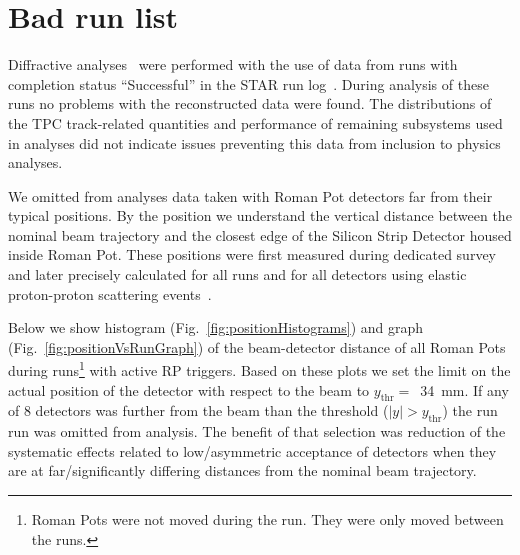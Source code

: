

\chapter{Bad run list}\label{chap:badRunList}

Diffractive analyses~\cite{AnalysisNoteRafal,AnalysisNoteLukasz} were performed with the use of data from runs with completion status ``Successful'' in the STAR run log~\cite{RunLog}. During analysis of these runs no problems with the reconstructed data were found. The distributions of the TPC track-related quantities and performance of remaining subsystems used in analyses did not indicate issues preventing this data from inclusion to physics analyses.

We omitted from analyses data taken with Roman Pot detectors far from their typical positions. By the position we understand the vertical distance between the nominal beam trajectory and the closest edge of the Silicon Strip Detector housed inside Roman Pot. These positions were first measured during dedicated survey~\cite{surveyNote} and later precisely calculated for all runs and for all detectors using elastic proton-proton scattering events~\cite{alignmentPresentation,alignmentDirectory}.%

Below we show histogram (Fig.~\ref{fig:positionHistograms}) and graph (Fig.~\ref{fig:positionVsRunGraph}) of the beam-detector distance of all Roman Pots during runs\footnote{Roman Pots were not moved during the run. They were only moved between the runs.} with active RP triggers. Based on these plots we set the limit on the actual position of the detector with respect to the beam to $y_{\text{thr}} =$~34~mm. If any of 8 detectors was further from the beam than the threshold ($|y|>y_{\text{thr}}$) the run run was omitted from analysis. The benefit of that selection was reduction of the systematic effects related to low/asymmetric acceptance of detectors when they are at far/significantly differing distances from the nominal beam trajectory.

